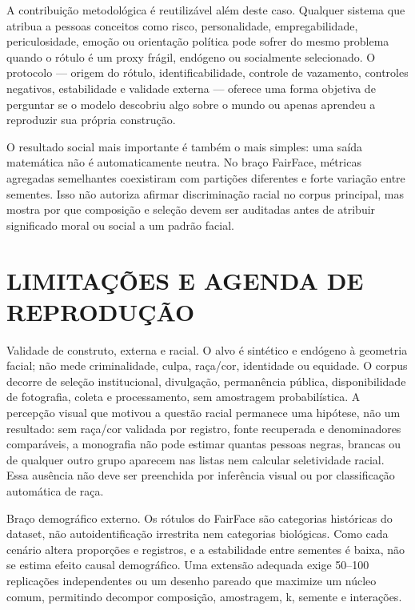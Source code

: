 A contribuição metodológica é reutilizável além deste caso. Qualquer sistema que atribua a pessoas conceitos como risco, personalidade, empregabilidade, periculosidade, emoção ou orientação política pode sofrer do mesmo problema quando o rótulo é um proxy frágil, endógeno ou socialmente selecionado. O protocolo --- origem do rótulo, identificabilidade, controle de vazamento, controles negativos, estabilidade e validade externa --- oferece uma forma objetiva de perguntar se o modelo descobriu algo sobre o mundo ou apenas aprendeu a reproduzir sua própria construção.

O resultado social mais importante é também o mais simples: uma saída matemática não é automaticamente neutra. No braço FairFace, métricas agregadas semelhantes coexistiram com partições diferentes e forte variação entre sementes. Isso não autoriza afirmar discriminação racial no corpus principal, mas mostra por que composição e seleção devem ser auditadas antes de atribuir significado moral ou social a um padrão facial.

\chapter{LIMITAÇÕES E AGENDA DE REPRODUÇÃO}

Validade de construto, externa e racial. O alvo é sintético e endógeno à geometria facial; não mede criminalidade, culpa, raça/cor, identidade ou equidade. O corpus decorre de seleção institucional, divulgação, permanência pública, disponibilidade de fotografia, coleta e processamento, sem amostragem probabilística. A percepção visual que motivou a questão racial permanece uma hipótese, não um resultado: sem raça/cor validada por registro, fonte recuperada e denominadores comparáveis, a monografia não pode estimar quantas pessoas negras, brancas ou de qualquer outro grupo aparecem nas listas nem calcular seletividade racial. Essa ausência não deve ser preenchida por inferência visual ou por classificação automática de raça.

Braço demográfico externo. Os rótulos do FairFace são categorias históricas do dataset, não autoidentificação irrestrita nem categorias biológicas. Como cada cenário altera proporções e registros, e a estabilidade entre sementes é baixa, não se estima efeito causal demográfico. Uma extensão adequada exige 50--100 replicações independentes ou um desenho pareado que maximize um núcleo comum, permitindo decompor composição, amostragem, k, semente e interações.

